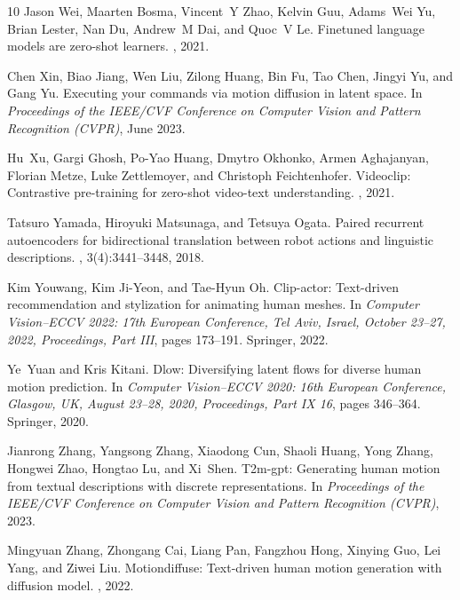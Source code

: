 \documentclass{article}
\begin{document}
{\begin{thebibliography}{10}
  Jason Wei, Maarten Bosma, Vincent~Y Zhao, Kelvin Guu, Adams~Wei Yu, Brian
    Lester, Nan Du, Andrew~M Dai, and Quoc~V Le.
  \newblock Finetuned language models are zero-shot learners.
  , 2021.
  
  Chen Xin, Biao Jiang, Wen Liu, Zilong Huang, Bin Fu, Tao Chen, Jingyi Yu, and
    Gang Yu.
  \newblock Executing your commands via motion diffusion in latent space.
  \newblock In {\em Proceedings of the IEEE/CVF Conference on Computer Vision and
    Pattern Recognition (CVPR)}, June 2023.
  
  Hu~Xu, Gargi Ghosh, Po-Yao Huang, Dmytro Okhonko, Armen Aghajanyan, Florian
    Metze, Luke Zettlemoyer, and Christoph Feichtenhofer.
  \newblock Videoclip: Contrastive pre-training for zero-shot video-text
    understanding.
  , 2021.
  
  Tatsuro Yamada, Hiroyuki Matsunaga, and Tetsuya Ogata.
  \newblock Paired recurrent autoencoders for bidirectional translation between
    robot actions and linguistic descriptions.
  , 3(4):3441--3448, 2018.
  
  Kim Youwang, Kim Ji-Yeon, and Tae-Hyun Oh.
  \newblock Clip-actor: Text-driven recommendation and stylization for animating
    human meshes.
  \newblock In {\em Computer Vision--ECCV 2022: 17th European Conference, Tel
    Aviv, Israel, October 23--27, 2022, Proceedings, Part III}, pages 173--191.
    Springer, 2022.
  
  Ye~Yuan and Kris Kitani.
  \newblock Dlow: Diversifying latent flows for diverse human motion prediction.
  \newblock In {\em Computer Vision--ECCV 2020: 16th European Conference,
    Glasgow, UK, August 23--28, 2020, Proceedings, Part IX 16}, pages 346--364.
    Springer, 2020.
  
  Jianrong Zhang, Yangsong Zhang, Xiaodong Cun, Shaoli Huang, Yong Zhang, Hongwei
    Zhao, Hongtao Lu, and Xi~Shen.
  \newblock T2m-gpt: Generating human motion from textual descriptions with
    discrete representations.
  \newblock In {\em Proceedings of the IEEE/CVF Conference on Computer Vision and
    Pattern Recognition (CVPR)}, 2023.
  
  Mingyuan Zhang, Zhongang Cai, Liang Pan, Fangzhou Hong, Xinying Guo, Lei Yang,
    and Ziwei Liu.
  \newblock Motiondiffuse: Text-driven human motion generation with diffusion
    model.
  , 2022.
  

\end{thebibliography}}
\end{document}
